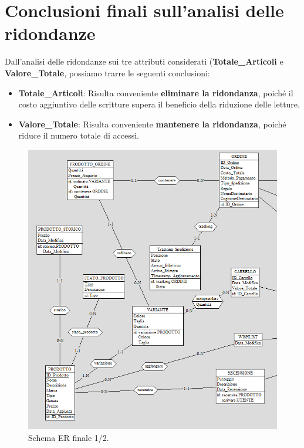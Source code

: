 \documentclass[a4paper,12pt]{report}
\begin{document}
	\section{Conclusioni finali sull'analisi delle ridondanze}
	Dall'analisi delle ridondanze sui tre attributi considerati (\textbf{Totale\_Articoli} e \textbf{Valore\_Totale}, possiamo trarre le seguenti conclusioni:
	\begin{itemize}
		\item \textbf{Totale\_Articoli}: Risulta conveniente \textbf{eliminare la ridondanza}, poiché il costo aggiuntivo delle scritture supera il beneficio della riduzione delle letture.
		\item \textbf{Valore\_Totale}: Risulta conveniente \textbf{mantenere la ridondanza}, poiché riduce il numero totale di accessi.
	\end{itemize}
	\begin{figure}[H]
		\centering
		\includegraphics[width=400pt]{ER/er_finale_sx.png}
		\caption{Schema ER finale 1/2.}
	\end{figure}
\end{document}
